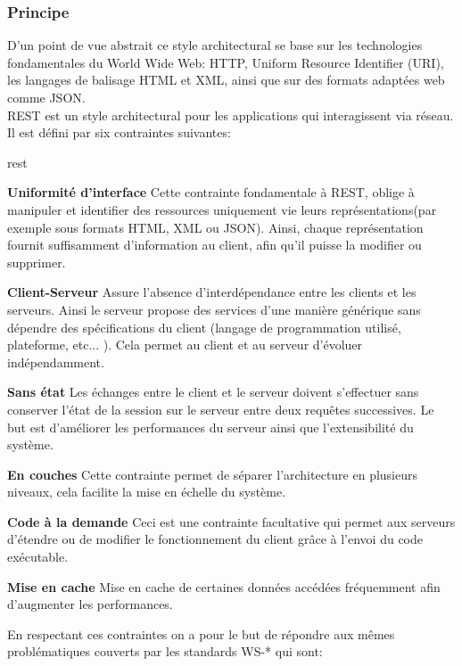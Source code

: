 \subsubsection{Principe}
D'un point de vue abstrait ce style architectural se base sur les technologies fondamentales du World Wide Web: HTTP, Uniform Resource Identifier (URI),  les langages de balisage HTML et XML, ainsi que sur des formats adaptées web comme JSON.\\
REST est un style architectural pour les applications qui interagissent via réseau. Il est défini par six contraintes suivantes: 
\begin{labeling}{rest}
	
\item [\textbf{Uniformité d'interface}] Cette contrainte fondamentale à REST, oblige à manipuler et identifier des ressources uniquement vie leurs représentations(par exemple sous formats HTML, XML ou JSON). Ainsi, chaque représentation fournit suffisamment d'information au client, afin qu'il puisse la modifier ou supprimer.

\item [\textbf{Client-Serveur}] Assure l'absence d'interdépendance entre les clients et les serveurs. Ainsi le serveur propose des services d'une manière générique sans dépendre des spécifications du client (langage de programmation utilisé, plateforme, etc... ). Cela permet au client et au serveur d'évoluer indépendamment. 


\item [\textbf{Sans état}] Les échanges entre le client et le serveur doivent s'effectuer sans conserver l'état de la session sur le serveur entre deux requêtes successives. Le but est d'améliorer les performances du serveur ainsi que l'extensibilité du système. 

\item [\textbf{En couches}] Cette contrainte permet de séparer l'architecture en plusieurs niveaux, cela facilite la mise en échelle du système. 
\item [\textbf{Code à la demande}] Ceci est une contrainte facultative qui permet aux serveurs d'étendre ou de modifier le fonctionnement du client grâce à l'envoi du code exécutable.
\item [\textbf{Mise en cache}] Mise en cache de certaines données accédées fréquemment afin d'augmenter les performances.

\end{labeling}
 En respectant ces contraintes on a pour le but de répondre aux mêmes problématiques couverts par les standards WS-* qui sont:
